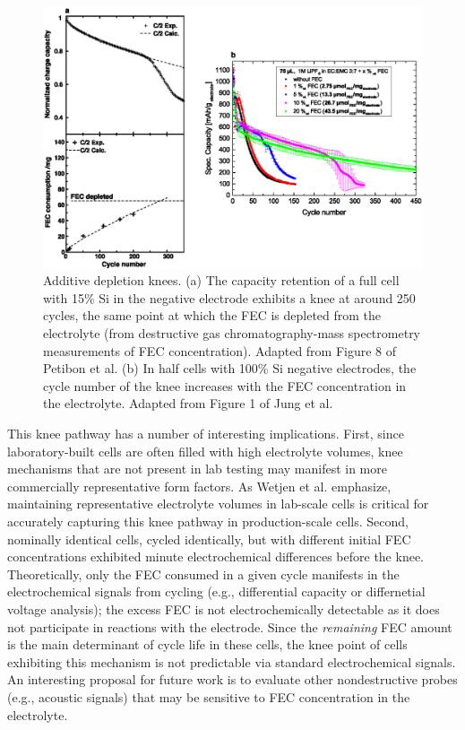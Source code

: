\documentclass[journal=jpcl, manuscript=article, layout=onecolumn]{achemso}
\begin{document}
\begin{figure}[ht]
\centering
\includegraphics[scale = 0.9]{figures/fec_depletion.eps}
\caption{Additive depletion knees.
(a) The capacity retention of a full cell with 15\% Si in the negative electrode exhibits a knee at around 250 cycles, the same point at which the FEC is depleted from the electrolyte (from destructive gas chromatography-mass spectrometry measurements of FEC concentration). Adapted from Figure 8 of Petibon et al.\cite{petibon_studies_2016}
(b) In half cells with 100\% Si negative electrodes, the cycle number of the knee increases with the FEC concentration in the electrolyte. Adapted from Figure 1 of Jung et al.\cite{jung_consumption_2016}}
\label{fig:fec_knee}
\end{figure}

This knee pathway has a number of interesting implications.
First, since laboratory-built cells are often filled with high electrolyte volumes, knee mechanisms that are not present in lab testing may manifest in more commercially representative form factors.
As Wetjen et al.\cite{wetjen_differentiating_2017} emphasize,
maintaining representative electrolyte volumes in lab-scale cells is critical for accurately capturing this knee pathway in production-scale cells.
Second, nominally identical cells, cycled identically, but with different initial FEC concentrations exhibited minute electrochemical differences before the knee.\cite{jung_consumption_2016}
Theoretically, only the FEC consumed in a given cycle manifests in the electrochemical signals from cycling (e.g., differential capacity or differnetial voltage analysis); the excess FEC is not electrochemically detectable as it does not participate in reactions with the electrode.
Since the \emph{remaining} FEC amount is the main determinant of cycle life in these cells, the knee point of cells exhibiting this mechanism is not predictable via standard electrochemical signals.
An interesting proposal for future work is to evaluate other nondestructive probes (e.g., acoustic signals\cite{knehr_understanding_2018}) that may be sensitive to FEC concentration in the electrolyte.
\end{document}
